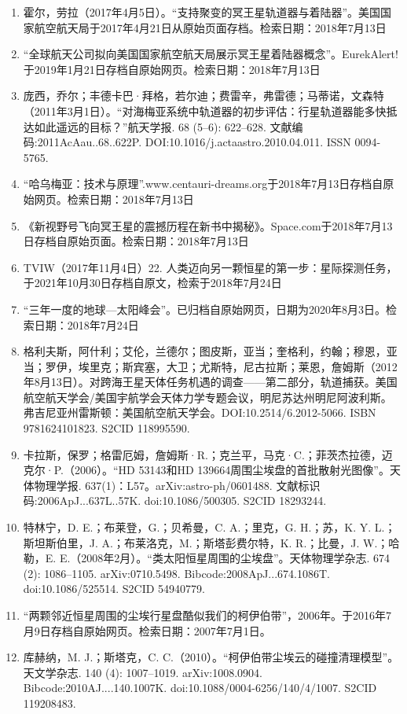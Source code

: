 \begin{enumerate}
\item 霍尔，劳拉（2017年4月5日）。“支持聚变的冥王星轨道器与着陆器”。美国国家航空航天局于2017年4月21日从原始页面存档。检索日期：2018年7月13日
\item “全球航天公司拟向美国国家航空航天局展示冥王星着陆器概念”。EurekAlert!于2019年1月21日存档自原始网页。检索日期：2018年7月13日
\item 庞西，乔尔；丰德卡巴·拜格，若尔迪；费雷辛，弗雷德；马蒂诺，文森特（2011年3月1日）。“对海梅亚系统中轨道器的初步评估：行星轨道器能多快抵达如此遥远的目标？”航天学报. 68 (5–6): 622–628. 文献编码:2011AcAau..68..622P. DOI:10.1016/j.actaastro.2010.04.011. ISSN 0094-5765.
\item “哈乌梅亚：技术与原理”.www.centauri-dreams.org于2018年7月13日存档自原始网页。检索日期：2018年7月13日
\item 《新视野号飞向冥王星的震撼历程在新书中揭秘》。Space.com于2018年7月13日存档自原始页面。检索日期：2018年7月13日
\item TVIW（2017年11月4日）22. 人类迈向另一颗恒星的第一步：星际探测任务，于2021年10月30日存档自原文，检索于2018年7月24日
\item “三年一度的地球—太阳峰会”。已归档自原始网页，日期为2020年8月3日。检索日期：2018年7月24日
\item 格利夫斯，阿什利；艾伦，兰德尔；图皮斯，亚当；奎格利，约翰；穆恩，亚当；罗伊，埃里克；斯宾塞，大卫；尤斯特，尼古拉斯；莱恩，詹姆斯（2012年8月13日）。对跨海王星天体任务机遇的调查——第二部分，轨道捕获。美国航空航天学会/美国宇航学会天体力学专题会议，明尼苏达州明尼阿波利斯。弗吉尼亚州雷斯顿：美国航空航天学会。DOI:10.2514/6.2012-5066. ISBN 9781624101823. S2CID 118995590.
\item 卡拉斯，保罗；格雷厄姆，詹姆斯·R.；克兰平，马克·C.；菲茨杰拉德，迈克尔·P.（2006）。“HD 53143和HD 139664周围尘埃盘的首批散射光图像”。天体物理学报. 637(1)：L57。arXiv:astro-ph/0601488. 文献标识码:2006ApJ...637L..57K. doi:10.1086/500305. S2CID 18293244.
\item 特林宁，D. E.；布莱登，G.；贝希曼，C. A.；里克，G. H.；苏，K. Y. L.；斯坦斯伯里，J. A.；布莱洛克，M.；斯塔彭费尔特，K. R.；比曼，J. W.；哈勒，E. E.（2008年2月）。“类太阳恒星周围的尘埃盘”。天体物理学杂志. 674 (2): 1086–1105. arXiv:0710.5498. Bibcode:2008ApJ...674.1086T. doi:10.1086/525514. S2CID 54940779.
\item “两颗邻近恒星周围的尘埃行星盘酷似我们的柯伊伯带”，2006年。于2016年7月9日存档自原始网页。检索日期：2007年7月1日。
\item 库赫纳，M. J.；斯塔克，C. C.（2010）。“柯伊伯带尘埃云的碰撞清理模型”。天文学杂志. 140 (4): 1007–1019. arXiv:1008.0904. Bibcode:2010AJ....140.1007K. doi:10.1088/0004-6256/140/4/1007. S2CID 119208483.
\end{enumerate}